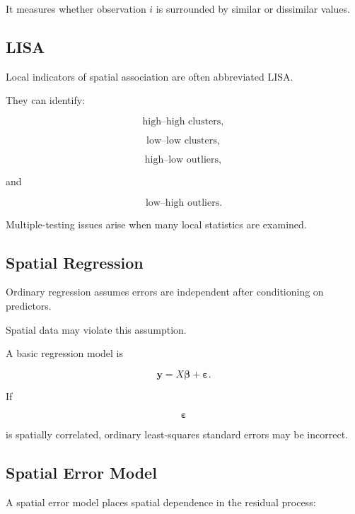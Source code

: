 It measures whether observation \(i\) is surrounded by similar or
dissimilar values.

\subsection{LISA}
\label{subsec:lisa}

Local indicators of spatial association are often abbreviated LISA.

They can identify:

\[
\boxed{
\text{high--high clusters},
}
\]

\[
\boxed{
\text{low--low clusters},
}
\]

\[
\boxed{
\text{high--low outliers},
}
\]

and

\[
\boxed{
\text{low--high outliers}.
}
\]

Multiple-testing issues arise when many local statistics are examined.

\subsection{Spatial Regression}
\label{subsec:spatial-regression}

Ordinary regression assumes errors are independent after conditioning on
predictors.

Spatial data may violate this assumption.

A basic regression model is

\[
\boxed{
\mathbf{y}
=
X\boldsymbol{\beta}
+
\boldsymbol{\varepsilon}.
}
\]

If

\[
\boldsymbol{\varepsilon}
\]

is spatially correlated, ordinary least-squares standard errors may be
incorrect.

\subsection{Spatial Error Model}
\label{subsec:spatial-error-model}

A spatial error model places spatial dependence in the residual process:


